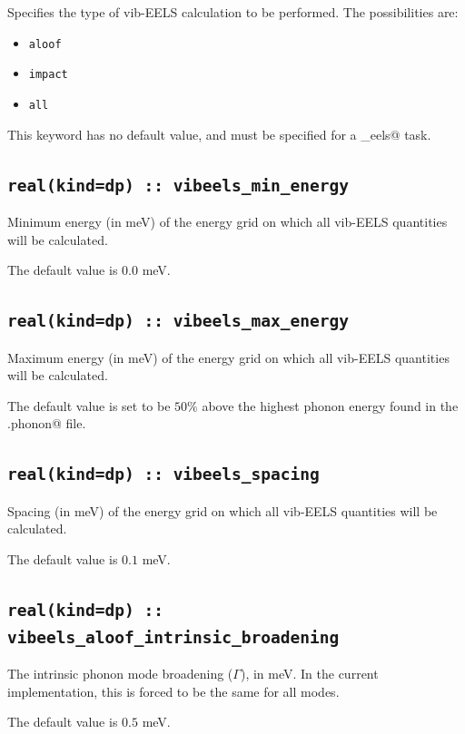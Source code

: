 \documentclass[a4paper,11pt,twoside]{book}
\begin{document}
{Specifies the type of vib-EELS calculation to be performed. The possibilities are:
\begin{itemize}
\item[{\bf --}]  \verb#aloof#
\item[{\bf --}]  \verb#impact#
\item[{\bf --}]  \verb#all#
\end{itemize}

This keyword has no default value, and must be specified for a \verb@phonon_eels@ task.

\subsection[vibeels\_min\_energy]{\tt real(kind=dp) :: vibeels\_min\_energy}

Minimum energy (in meV) of the energy grid on which all vib-EELS quantities will be calculated.

The default value is $0.0$ meV.

\subsection[vibeels\_max\_energy]{\tt real(kind=dp) :: vibeels\_max\_energy}

Maximum energy (in meV) of the energy grid on which all vib-EELS quantities will be calculated.

The default value is set to be $50\%$ above the highest phonon energy found in the \verb@.phonon@ file.

\subsection[vibeels\_spacing]{\tt real(kind=dp) :: vibeels\_spacing}

Spacing (in meV) of the energy grid on which all vib-EELS quantities will be calculated.

The default value is $0.1$ meV.

\subsection[vibeels\_aloof\_intrinsic\_broadening]{\tt real(kind=dp) :: vibeels\_aloof\_intrinsic\_broadening}

The intrinsic phonon mode broadening ($\Gamma$), in meV. In the current implementation, this is forced to be the same for all modes.

The default value is $0.5$ meV.

}
\end{document}
